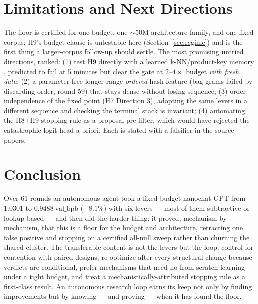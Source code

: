 \documentclass{article}
\newcommand{\valbpb}{\mathrm{val\_bpb}}
\begin{document}
\section{Limitations and Next Directions}
\label{sec:limits}

The floor is certified for one budget, one $\sim$50M architecture family, and one fixed corpus; H9's budget clause is untestable here (Section~\ref{sec:regime}) and is the first thing a larger-corpus follow-up should settle. The most promising untried directions, ranked: (1) test H9 directly with a learned k-NN/product-key memory \cite{lample2019pkm}, predicted to fail at 5 minutes but clear the gate at $2$--$4\times$ budget \emph{with fresh data}; (2) a parameter-free longer-range \emph{ordered} hash feature (bag-grams failed by discarding order, round 59) that stays dense without losing sequence; (3) order-independence of the fixed point (H7 Direction 3), adopting the same levers in a different sequence and checking the terminal stack is invariant; (4) automating the H8$+$H9 stopping rule as a proposal pre-filter, which would have rejected the catastrophic logit head a priori. Each is stated with a falsifier in the source papers.

\section{Conclusion}
\label{sec:conclusion}

Over 61 rounds an autonomous agent took a fixed-budget nanochat GPT from $1.0301$ to $0.9488\ \valbpb$ ($+8.1\%$) with six levers --- most of them subtractive or lookup-based --- and then did the harder thing: it proved, mechanism by mechanism, that this is a floor for the budget and architecture, retracting one false positive and stopping on a certified all-null sweep rather than churning the shared cluster. The transferable content is not the levers but the loop: control for contention with paired designs, re-optimize after every structural change because verdicts are conditional, prefer mechanisms that need no from-scratch learning under a tight budget, and treat a mechanistically-attributed stopping rule as a first-class result. An autonomous research loop earns its keep not only by finding improvements but by knowing --- and proving --- when it has found the floor.


\end{document}

